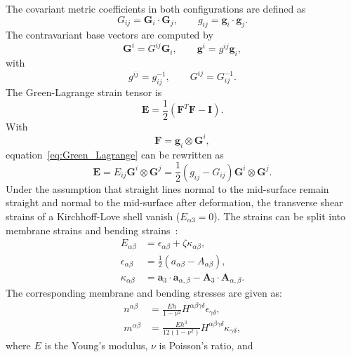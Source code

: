 \documentclass[preprint,12pt]{elsarticle}
\theoremstyle{remark}
\begin{document}
The covariant metric coefficients in both configurations are defined as
\begin{equation}
    G_{ij}=\mathbf{G}_i\cdot\mathbf{G}_j, \qquad {}g_{ij}=\mathbf{g}_i\cdot\mathbf{g}_j.
\end{equation}
The contravariant base vectors are computed by 
\begin{equation}
    \mathbf{G}^i = G^{ij}\mathbf{G}_i, \qquad\mathbf{g}^i = g^{ij}\mathbf{g}_i,
\end{equation}
with
\begin{equation}
    g^{ij} = g_{ij}^{-1}, \qquad G^{ij} = G_{ij}^{-1}.
\end{equation}
The Green-Lagrange strain tensor is
\begin{equation}
    \mathbf{E}=\frac{1}{2}\left({\mathbf{F}^T\mathbf{F}-\mathbf{I}}\right).\label{eq:Green_Lagrange}
\end{equation}
With
\begin{equation}
    \mathbf{F} = \mathbf{g}_i\otimes\mathbf{G}^i,
\end{equation}
equation~\eqref{eq:Green_Lagrange} can be rewritten as
\begin{equation}
    \mathbf{E}=E_{ij}\mathbf{G}^i\otimes\mathbf{G}^j=\frac{1}{2}\left({g_{ij}-G_{ij}}\right)\mathbf{G}^i\otimes\mathbf{G}^j.
\end{equation}
Under the assumption that straight lines normal to the mid-surface remain straight and normal to the mid-surface after deformation, the transverse shear strains of a Kirchhoff-Love shell vanish ($E_{\alpha{}3}=0$). The strains can be split into membrane strains and bending strains~\cite{bischoff2018models}:
\begin{align}
    E_{\alpha \beta}& = \epsilon_{\alpha \beta}+\zeta\kappa_{\alpha \beta},\\
    \epsilon_{\alpha \beta} &= \frac{1}{2}\left({a_{\alpha \beta}-A_{\alpha \beta}}\right),\\
    \kappa_{\alpha \beta} &= \mathbf{a}_{3}\cdot\mathbf{a}_{\alpha{,} \beta}-\mathbf{A}_3\cdot\mathbf{A}_{\alpha{,} \beta}.
\end{align}
The corresponding membrane and bending stresses are given as:
\begin{align}
    n^{\alpha\beta} &= \frac{Eh}{1-\nu^2}H^{\alpha\beta\gamma\delta}\epsilon_{\gamma\delta},\\
    m^{\alpha\beta} &= \frac{Eh^3}{12(1-\nu^2)}H^{\alpha\beta\gamma\delta}\kappa_{\gamma\delta},
\end{align}
where $E$ is the Young’s modulus, $\nu$ is Poisson’s ratio, and
\end{document}
